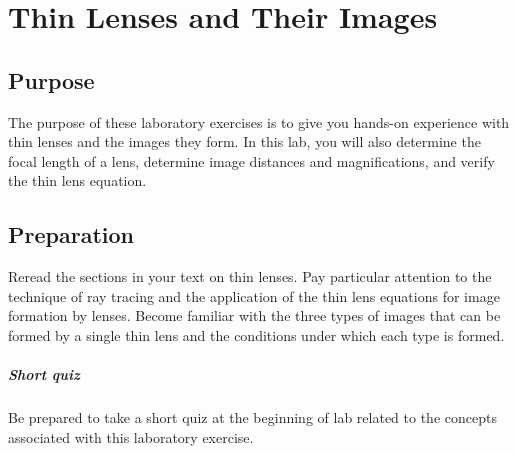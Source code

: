 \chapter{Thin Lenses and Their Images}

\section{Purpose}
  The purpose of these laboratory exercises is to give you hands-on experience with thin lenses and the images they form. In this lab, you will also determine the focal length of a lens, determine image distances and magnifications, and verify the thin lens equation.
  





\section{Preparation}
Reread the sections in your text on thin lenses.  Pay particular attention to the technique of ray tracing and the application of the thin lens equations for image formation by lenses.  Become familiar with the three types of images that can be formed by a single thin lens and the conditions under which each type is formed.

\paragraph{Short quiz}
  Be prepared to take a short quiz at the beginning of lab related to the concepts associated with this laboratory exercise.

